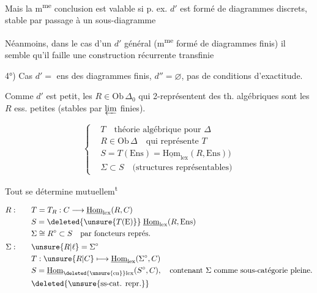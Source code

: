 Mais la m\textsuperscript{me} conclusion est valable si p. ex. $d'$ est formé de diagrammes discrets, stable par passage à un sous-diagramme \unsure{(|\{} 

Néanmoins, dans le cas d'un $d'$ général (m\textsuperscript{me} formé de diagrammes finis) il semble qu'il faille une construction récurrente transfinie

4°) Cas $d'=$ ens des diagrammes finis, $d''=\varnothing$, pas de conditions d'exactitude.

Comme $d'$ est petit, les $R\in\mathrm{Ob}\,\Delta_0$ qui 2-représentent des th. algébriques sont les $R$ ess. petites (stables par $\varprojlim$ finies). 

\[
\left\{\begin{aligned}
&T\quad\text{théorie algébrique pour }\Delta\\
&R\in\mathrm{Ob}\,\Delta\quad\text{qui représente }T\\
&S=T(\mathrm{Ens})=\underline{\mathrm{Hom}}_{\mathrm{lex}}(R,\mathrm{Ens}))\\
&\Sigma\subset S\quad\text{(structures représentables)}
\end{aligned}\right.
\]

Tout se détermine mutuellem\textsuperscript{t}

\[
\begin{aligned}
R:\qquad&T=T_R:C\longrightarrow\underline{\mathrm{Hom}}_{\mathrm{lex}}(R,C)\\
&S=\deleted{\unsure{T(\mathrm{E})}}\;\underline{\mathrm{Hom}}_{\mathrm{lex}}(R,\mathrm{Ens})\\
&\Sigma\cong R^\circ\subset S\quad\text{par foncteurs représ.}\\[2pt]
\Sigma:\qquad&\unsure{R|\ell}=\Sigma^\circ\\
&T:\unsure{R|C}\longmapsto\underline{\mathrm{Hom}}_{\mathrm{lex}}(\Sigma^\circ,C)\\
&S=\underline{\mathrm{Hom}}_{\deleted{\unsure{\mathrm{en}}}\mathrm{lex}}(S^\circ,C),\quad\text{contenant }\Sigma\text{ comme sous-catégorie pleine.}\\
&\deleted{\unsure{\text{ss-cat. repr.}}}
\end{aligned}
\]


